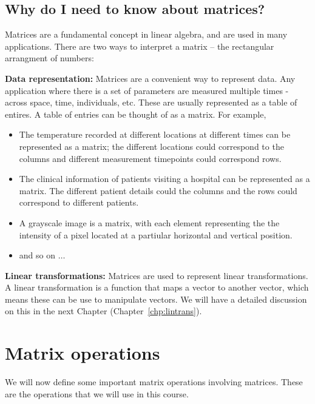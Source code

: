 \subsection{Why do I need to know about matrices?}
Matrices are a fundamental concept in linear algebra, and are used in many applications. There are two ways to interpret a matrix -- the rectangular arrangment of numbers:

\vspace{0.2cm}
\noindent \textbf{Data representation:} Matrices are a convenient way to represent data. Any application where there is a set of parameters are measured multiple times - across space, time, individuals, etc. These are usually represented as a table of entires. A table of entries can be thought of as a matrix. For example, 
\begin{itemize}
    \item The temperature recorded at different locations at different times can be represented as a matrix; the different locations could correspond to the columns and different measurement timepoints could correspond rows.
    \item The clinical information of patients visiting a hospital can be represented as a matrix. The different patient details could the columns and the rows could correspond to different patients.
    \item A grayscale image is a matrix, with each element representing the the intensity of a pixel located at a partiular horizontal and vertical position.
    \item and so on $\ldots$
\end{itemize}

\vspace{0.2cm}
\noindent \textbf{Linear transformations:} Matrices are used to represent linear transformations. A linear transformation is a function that maps a vector to another vector, which means these can be use to manipulate vectors. We will have a detailed discussion on this in the next Chapter (Chapter~\ref{chp:lintrans}).

\section{Matrix operations}
We will now define some important matrix operations involving matrices. These are the operations that we will use in this course.

